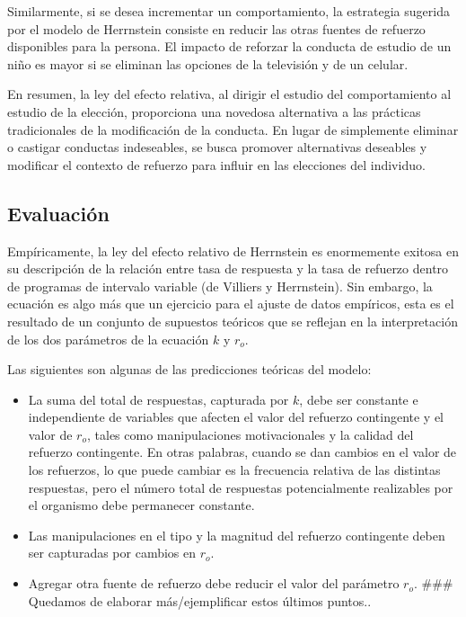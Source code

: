 \documentclass[
  letterpaper,
]{book}
\providecommand{\tightlist}{%
  \setlength{\itemsep}{0pt}\setlength{\parskip}{0pt}}\usepackage{longtable,booktabs,array}
\begin{document}
Similarmente, si se desea incrementar un comportamiento, la estrategia
sugerida por el modelo de Herrnstein consiste en reducir las otras
fuentes de refuerzo disponibles para la persona. El impacto de reforzar
la conducta de estudio de un niño es mayor si se eliminan las opciones
de la televisión y de un celular.

En resumen, la ley del efecto relativa, al dirigir el estudio del
comportamiento al estudio de la elección, proporciona una novedosa
alternativa a las prácticas tradicionales de la modificación de la
conducta. En lugar de simplemente eliminar o castigar conductas
indeseables, se busca promover alternativas deseables y modificar el
contexto de refuerzo para influir en las elecciones del individuo.

\subsection{Evaluación}\label{evaluaciuxf3n}

Empíricamente, la ley del efecto relativo de Herrnstein es enormemente
exitosa en su descripción de la relación entre tasa de respuesta y la
tasa de refuerzo dentro de programas de intervalo variable (de Villiers
y Herrnstein). Sin embargo, la ecuación es algo más que un ejercicio
para el ajuste de datos empíricos, esta es el resultado de un conjunto
de supuestos teóricos que se reflejan en la interpretación de los dos
parámetros de la ecuación \(k\) y \(r_o\).

Las siguientes son algunas de las predicciones teóricas del modelo:

\begin{itemize}
\tightlist
\item
  La suma del total de respuestas, capturada por \(k\), debe ser
  constante e independiente de variables que afecten el valor del
  refuerzo contingente y el valor de \(r_o\), tales como manipulaciones
  motivacionales y la calidad del refuerzo contingente. En otras
  palabras, cuando se dan cambios en el valor de los refuerzos, lo que
  puede cambiar es la frecuencia relativa de las distintas respuestas,
  pero el número total de respuestas potencialmente realizables por el
  organismo debe permanecer constante.
\item
  Las manipulaciones en el tipo y la magnitud del refuerzo contingente
  deben ser capturadas por cambios en \(r_o\).
\item
  Agregar otra fuente de refuerzo debe reducir el valor del parámetro
  \(r_o\). \#\#\# Quedamos de elaborar más/ejemplificar estos últimos
  puntos..
\end{itemize}
\end{document}
